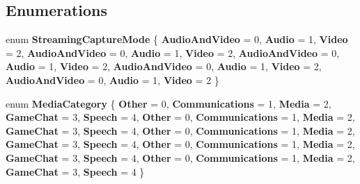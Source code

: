 \subsection*{Enumerations}
\begin{DoxyCompactItemize}
\item 
\mbox{\label{namespace_windows_1_1_media_1_1_capture_a69a6672cfbdb543586234a95b0049c04}} 
enum {\bfseries Streaming\+Capture\+Mode} \{ \newline
{\bfseries Audio\+And\+Video} = 0, 
{\bfseries Audio} = 1, 
{\bfseries Video} = 2, 
{\bfseries Audio\+And\+Video} = 0, 
\newline
{\bfseries Audio} = 1, 
{\bfseries Video} = 2, 
{\bfseries Audio\+And\+Video} = 0, 
{\bfseries Audio} = 1, 
\newline
{\bfseries Video} = 2, 
{\bfseries Audio\+And\+Video} = 0, 
{\bfseries Audio} = 1, 
{\bfseries Video} = 2, 
\newline
{\bfseries Audio\+And\+Video} = 0, 
{\bfseries Audio} = 1, 
{\bfseries Video} = 2
 \}
\item 
\mbox{\label{namespace_windows_1_1_media_1_1_capture_a2061b374080798df6bea2b4f65634663}} 
enum {\bfseries Media\+Category} \{ \newline
{\bfseries Other} = 0, 
{\bfseries Communications} = 1, 
{\bfseries Media} = 2, 
{\bfseries Game\+Chat} = 3, 
\newline
{\bfseries Speech} = 4, 
{\bfseries Other} = 0, 
{\bfseries Communications} = 1, 
{\bfseries Media} = 2, 
\newline
{\bfseries Game\+Chat} = 3, 
{\bfseries Speech} = 4, 
{\bfseries Other} = 0, 
{\bfseries Communications} = 1, 
\newline
{\bfseries Media} = 2, 
{\bfseries Game\+Chat} = 3, 
{\bfseries Speech} = 4, 
{\bfseries Other} = 0, 
\newline
{\bfseries Communications} = 1, 
{\bfseries Media} = 2, 
{\bfseries Game\+Chat} = 3, 
{\bfseries Speech} = 4, 
\newline
{\bfseries Other} = 0, 
{\bfseries Communications} = 1, 
{\bfseries Media} = 2, 
{\bfseries Game\+Chat} = 3, 
\newline
{\bfseries Speech} = 4
 \}
\item 
\mbox{\label{namespace_windows_1_1_media_1_1_capture_a69a6672cfbdb543586234a95b0049c04}} 

\end{DoxyCompactItemize}
